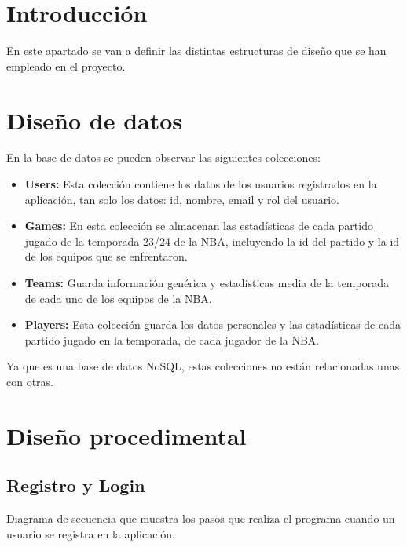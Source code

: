 
\section{Introducción}
En este apartado se van a definir las distintas estructuras de diseño que se han empleado en el proyecto.

\hfill

\section{Diseño de datos}
En la base de datos se pueden observar las siguientes colecciones:
\begin{itemize}
\tightlist
    \item \textbf{Users:} Esta colección contiene los datos de los usuarios registrados en la aplicación, tan solo los datos: id, nombre, email y rol del usuario.
    \item \textbf{Games:} En esta colección se almacenan las estadísticas de cada partido jugado de la temporada 23/24 de la NBA, incluyendo la id del partido y la id de los equipos que se enfrentaron.
    \item \textbf{Teams:} Guarda información genérica y estadísticas media de la temporada de cada uno de los equipos de la NBA.
    \item \textbf{Players:} Esta colección guarda los datos personales y las estadísticas de cada partido jugado en la temporada, de cada jugador de la NBA.
\end{itemize}
Ya que es una base de datos NoSQL, estas colecciones no están relacionadas unas con otras.

\clearpage

\section{Diseño procedimental}

\hfill

\subsection{Registro y Login}

\hfill

Diagrama de secuencia que muestra los pasos que realiza el programa cuando un usuario se registra en la aplicación.

